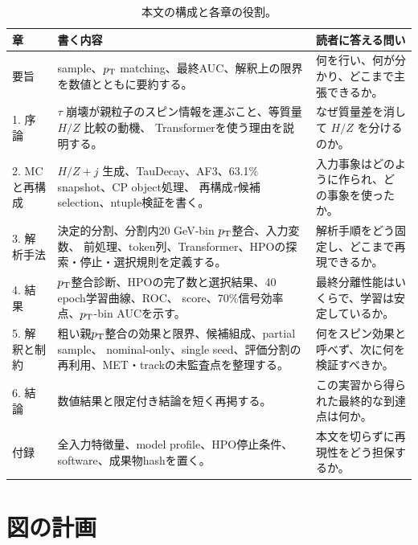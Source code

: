 \documentclass[xelatex,ja=standard,a4paper,10pt]{bxjsarticle}
\begin{document}
\begin{table}[H]
  \centering
  \small
  \begin{tabularx}{\textwidth}{@{}p{}X X@{}}
    \toprule
    章 & 書く内容 & 読者に答える問い \\
    \midrule
    要旨
      & sample、\(p_{\mathrm{T}}\) matching、最終AUC、解釈上の限界を数値とともに要約する。
      & 何を行い、何が分かり、どこまで主張できるか。\\
    1. 序論
      & \(\tau\) 崩壊が親粒子のスピン情報を運ぶこと、等質量 \(H/Z\) 比較の動機、
        Transformerを使う理由を説明する。
      & なぜ質量差を消して \(H/Z\) を分けるのか。\\
    2. MCと再構成
      & \(H/Z+j\) 生成、TauDecay、AF3、63.1\% snapshot、CP object処理、
        再構成\(\tau\)候補selection、ntuple検証を書く。
      & 入力事象はどのように作られ、どの事象を使ったか。\\
    3. 解析手法
      & 決定的分割、分割内20 GeV-bin \(p_{\mathrm{T}}\)整合、入力変数、
        前処理、token列、Transformer、HPOの探索・停止・選択規則を定義する。
      & 解析手順をどう固定し、どこまで再現できるか。\\
    4. 結果
      & \(p_{\mathrm{T}}\)整合診断、HPOの完了数と選択結果、40 epoch学習曲線、ROC、
        score、70\%信号効率点、\(p_{\mathrm{T}}\)-bin AUCを示す。
      & 最終分離性能はいくらで、学習は安定しているか。\\
    5. 解釈と制約
      & 粗い親\(p_{\mathrm{T}}\)整合の効果と限界、候補組成、partial sample、
        nominal-only、single seed、評価分割の再利用、MET・trackの未監査点を整理する。
      & 何をスピン効果と呼べず、次に何を検証すべきか。\\
    6. 結論
      & 数値結果と限定付き結論を短く再掲する。
      & この実習から得られた最終的な到達点は何か。\\
    付録
      & 全入力特徴量、model profile、HPO停止条件、software、成果物hashを置く。
      & 本文を切らずに再現性をどう担保するか。\\
    \bottomrule
  \end{tabularx}
  \caption{本文の構成と各章の役割。}
\end{table}

\section{図の計画}
\end{document}
